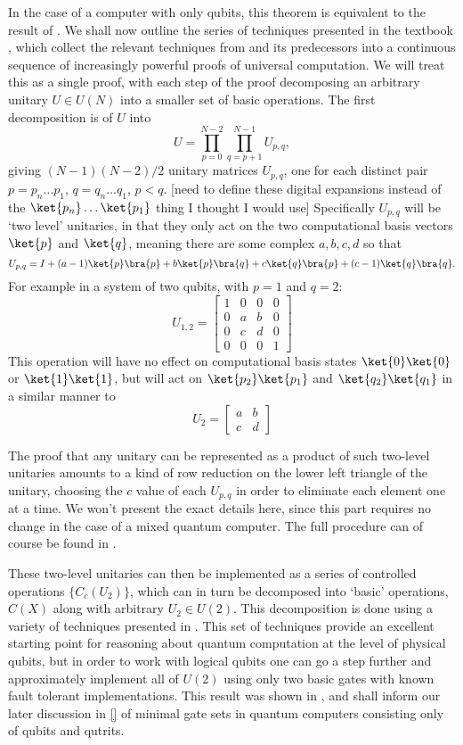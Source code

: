 In the case of a computer with only qubits, this theorem is equivalent to the result of \cite{cnot-decomposition}. We shall now outline the series of techniques presented in the textbook \cite{textbook}, which collect the relevant techniques from \cite{cnot-decomposition} and its predecessors into a continuous sequence of increasingly powerful proofs of universal computation. We will treat this as a single proof, with each step of the proof decomposing an arbitrary unitary $U \in U(N)$ into a smaller set of basic operations. The first decomposition is of $U$ into
\[U = \prod_{p=0}^{N-2}\prod_{q=p+1}^{N-1}U_{p,q},\]
giving $(N-1)(N-2)/2$ unitary matrices $U_{p,q}$, one for each distinct pair $p = p_n\dots p_1$, $q = q_n\dots q_1$, $p < q$. [need to define these digital expansions instead of the $\ket{p_n}\dots\ket{p_1}$ thing I thought I would use] Specifically $U_{p,q}$ will be `two level' unitaries, in that they only act on the two computational basis vectors $\ket{p}$ and $\ket{q}$, meaning there are some complex $a, b, c, d$ so that
\[U_{p,q} = I + (a-1)\ket{p}\bra{p} + b\ket{p}\bra{q}+ c\ket{q}\bra{p}+ (c-1)\ket{q}\bra{q}.\]
For example in a system of two qubits, with $p = 1$ and $q = 2$:
\[U_{1,2} = \begin{bmatrix}
1 & 0 & 0 & 0 \\
0 & a & b & 0 \\
0 & c & d & 0 \\
0 & 0 & 0 & 1
\end{bmatrix}\]
This operation will have no effect on computational basis states $\ket{0}\ket{0}$ or $\ket{1}\ket{1}$, but will act on $\ket{p_2}\ket{p_1}$ and $\ket{q_2}\ket{q_1}$ in a similar manner to
\[U_2 = \begin{bmatrix}
a & b \\
c & d
\end{bmatrix}\]

The proof that any unitary can be represented as a product of such two-level unitaries amounts to a kind of row reduction on the lower left triangle of the unitary, choosing the $c$ value of each $U_{p,q}$ in order to eliminate each element one at a time. We won't present the exact details here, since this part requires no change in the case of a mixed quantum computer. The full procedure can of course be found in \cite{textbook}.

These two-level unitaries can then be implemented as a series of controlled operations $\{C_c(U_2)\}$, which can in turn be decomposed into `basic' operations, $C(X)$ along with arbitrary $U_2 \in U(2)$. This decomposition is done using a variety of techniques presented in \cite{cnot-decomposition}. This set of techniques provide an excellent starting point for reasoning about quantum computation at the level of physical qubits, but in order to work with logical qubits one can go a step further and approximately implement all of $U(2)$ using only two basic gates with known fault tolerant implementations. This result was shown in \cite{universal-qubit}, and shall inform our later discussion in \ref{} of minimal gate sets in quantum computers consisting only of qubits and qutrits.

